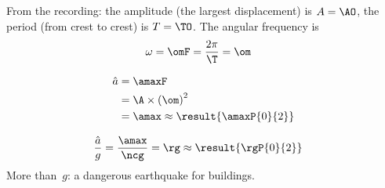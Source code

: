 From the recording: the amplitude (the largest displacement) is $A = \AO$, the period (from crest to crest) is $T = \TO$. The angular frequency is
\begin{align}
 \omega &= \omF = \frac{2\pi}{\T} = \om
\end{align}

\begin{abcliste}
\abc
\begin{align}
 \hat a &= \amaxF \\
   &= \A\times\left(\om\right)^2 \\
   &= \amax \approx \result{\amaxP{0}{2}}
\end{align}

\abc
\begin{align}
 \frac{\hat a}{g} &= \frac{\amax}{\ncg} = \rg \approx \result{\rgP{0}{2}}
\end{align}
More than \rdO\,$g$: a dangerous earthquake for buildings.
\end{abcliste}
